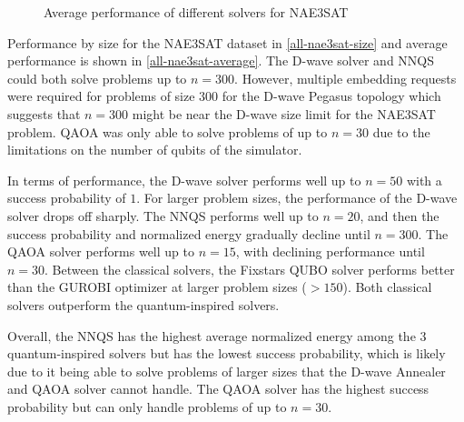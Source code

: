 \begin{figure}[!htbp]
    \centering
    \hfill
    \caption{Average performance of different solvers for NAE3SAT}
    \label{all-nae3sat-average}
\end{figure}

Performance by size for the NAE3SAT dataset in \autoref{all-nae3sat-size} and average performance is shown in \autoref{all-nae3sat-average}. The D-wave solver and NNQS could both solve problems up to $n=300$. However, multiple embedding requests were required for problems of size $300$ for the D-wave Pegasus topology which suggests that $n=300$ might be near the D-wave size limit for the NAE3SAT problem. QAOA was only able to solve problems of up to $n=30$ due to the limitations on the number of qubits of the simulator.

In terms of performance, the D-wave solver performs well up to $n=50$ with a success probability of $1$. For larger problem sizes, the performance of the D-wave solver drops off sharply. The NNQS performs well up to $n=20$, and then the success probability and normalized energy gradually decline until $n=300$. The QAOA solver performs well up to $n=15$, with declining performance until $n=30$. Between the classical solvers, the Fixstars QUBO solver performs better than the GUROBI optimizer at larger problem sizes ($>150$). Both classical solvers outperform the quantum-inspired solvers.

Overall, the NNQS has the highest average normalized energy among the 3 quantum-inspired solvers but has the lowest success probability, which is likely due to it being able to solve problems of larger sizes that the D-wave Annealer and QAOA solver cannot handle. The QAOA solver has the highest success probability but can only handle problems of up to $n=30$.

